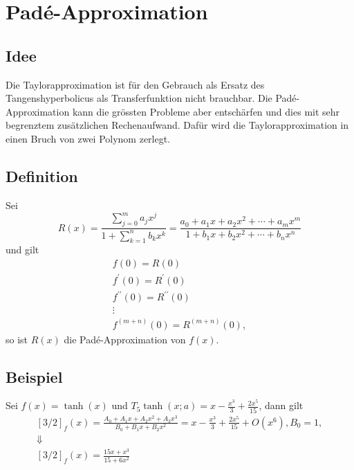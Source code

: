 %
%
%
\section{Padé-Approximation
\label{transfer:section:teil2}}
\rhead{}

\subsection{Idee
	\label{transfer:pade:idee}}
Die Taylorapproximation ist für den Gebrauch als Ersatz des Tangenshyperbolicus als Transferfunktion nicht brauchbar. Die Padé-Approximation kann die grössten Probleme aber entschärfen und dies mit sehr begrenztem zusätzlichen Rechenaufwand. Dafür wird die Taylorapproximation in einen Bruch von zwei Polynom zerlegt.

\subsection{Definition
\label{transfer:pade:definition}}
Sei
\begin{equation}
	R(x)=\frac{\sum_{j=0}^{m} a_{j} x^{j}}{1+\sum_{k=1}^{n} b_{k} x^{k}}=\frac{a_{0}+a_{1} x+a_{2} x^{2}+\cdots+a_{m} x^{m}}{1+b_{1} x+b_{2} x^{2}+\cdots+b_{n} x^{n}} 
\end{equation}
und gilt
\begin{gather*}
	f(0) =R(0) \\
	f^{\prime}(0) =R^{\prime}(0) \\
	f^{\prime \prime}(0) =R^{\prime \prime}(0) \\
	\vdots \\
	f^{(m+n)}(0) =R^{(m+n)}(0),
\end{gather*}
so ist $R(x)$ die Padé-Approximation von $f(x)$.
\subsection{Beispiel
	\label{transfer:pade:beispiel}}
Sei $f(x) = \tanh (x)$ und $T_{5} \tanh(x ; a) = x-\frac{x^{3}}{3}+\frac{2 x^{5}}{15}$, dann gilt
$$
	\begin{gathered}  
	[3 / 2]_{f}(x) = \frac{A_{0}+A_{1} x+A_{2} x^{2}+A_{3} x^{3}}{B_{0}+B_{1} x+B_{2} x^{2}}=x-\frac{x^{3}}{3}+\frac{2 x^{5}}{15}+O\left(x^{6}\right), B_{0} = 1,\\
	\Downarrow \\
	[3 / 2]_{f}(x) = \frac{15x+x^3}{15+6x^2}
\end{gathered}
$$

